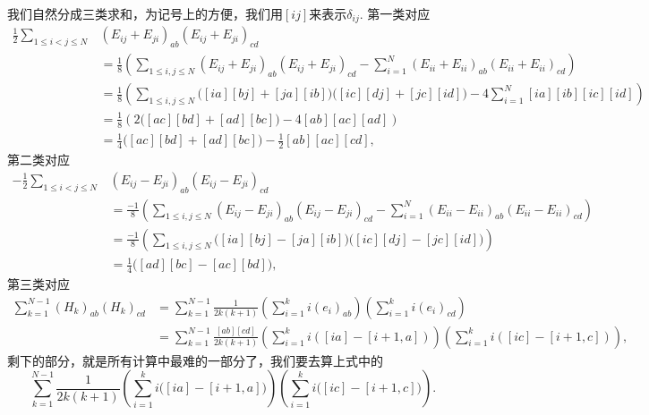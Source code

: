 \documentclass[9pt]{extarticle}
\begin{document}
\proof 我们自然分成三类求和，为记号上的方便，我们用$[ij]$来表示$\delta_{ij}$. 第一类对应
\begin{equation}
\label{1}
\begin{split}
	\frac{1}{2}\sum_{1\leq i < j\leq N}&(E_{ij}+E_{ji})_{ab}(E_{ij}+E_{ji})_{cd}\\
	&=\frac{1}{8}\left(\sum_{1\leq i,j\leq N}(E_{ij}+E_{ji})_{ab}(E_{ij}+E_{ji})_{cd}-\sum_{i=1}^N(E_{ii}+E_{ii})_{ab}(E_{ii}+E_{ii})_{cd}\right)\\
	&=\frac{1}{8}\left(\sum_{1\leq i,j\leq N}\bigl([ia][bj]+[ja][ib]\bigr)\bigl([ic][dj]+[jc][id]\bigr)-4\sum_{i=1}^N[ia][ib][ic][id]\right)\\
	&=\frac{1}{8}\left(2\bigl([ac][bd]+[ad][bc]\bigr)-4[ab][ac][ad]\right)\\
	&=\frac{1}{4}\bigl([ac][bd]+[ad][bc]\bigr)-\frac{1}{2}[ab][ac][cd],
\end{split}
\end{equation}
第二类对应
\begin{equation}
\label{2}
\begin{split}
	-\frac{1}{2}\sum_{1\leq i < j\leq N}&(E_{ij}-E_{ji})_{ab}(E_{ij}-E_{ji})_{cd}\\
	&=\frac{-1}{8}\left(\sum_{1\leq i,j\leq N}(E_{ij}-E_{ji})_{ab}(E_{ij}-E_{ji})_{cd}-\sum_{i=1}^N(E_{ii}-E_{ii})_{ab}(E_{ii}-E_{ii})_{cd}\right)\\
	&=\frac{-1}{8}\left(\sum_{1\leq i,j\leq N}\bigl([ia][bj]-[ja][ib]\bigr)\bigl([ic][dj]-[jc][id]\bigr)\right)\\
	&=\frac{1}{4}\bigl([ad][bc]-[ac][bd]\bigr),
\end{split}
\end{equation}
第三类对应
\begin{equation}
\label{4}
\begin{split}
	\sum_{k=1}^{N-1}(H_k)_{ab}(H_k)_{cd}&=\sum_{k=1}^{N-1}\frac{1}{2k(k+1)}\left(\sum_{i=1}^k i(e_{i})_{ab}\right)\left(\sum_{i=1}^k i(e_{i})_{cd}\right)\\
	&=\sum_{k=1}^{N-1}\frac{[ab][cd]}{2k(k+1)}\left(\sum_{i=1}^k i([ia]-[i+1,a])\right)\left(\sum_{i=1}^k i([ic]-[i+1,c])\right),
\end{split}
\end{equation}
剩下的部分，就是所有计算中最难的一部分了，我们要去算上式中的
\begin{equation}
\sum_{k=1}^{N-1}\frac{1}{2k(k+1)}\left(\sum_{i=1}^k i\bigl([ia]-[i+1,a]\bigr)\right)\left(\sum_{i=1}^k i\bigl([ic]-[i+1,c]\bigr)\right).
\end{equation}
\end{document}
